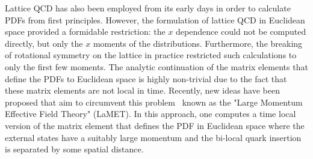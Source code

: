 
Lattice QCD has also been employed from its early days in order  to calculate PDFs from first principles.  However, the
formulation of lattice QCD in Euclidean space provided a formidable
restriction: the $x$ dependence could not be computed directly, but
only the $x$ moments of the distributions.  Furthermore, the breaking
of rotational symmetry on the lattice in practice restricted such
calculations to only the first few moments. 
The analytic continuation of the matrix elements that define the PDFs to Euclidean space is highly non-trivial due to the fact that these matrix elements are not local in time.
Recently, new ideas have
been proposed that aim to circumvent this
problem~\cite{Ji:2013dva,Ji:2014gla} known as the "Large Momentum Effective Field Theory" (LaMET).
In this approach, one computes a time local version of the matrix element that defines the PDF in Euclidean space
where the external states have a suitably large momentum  and the
bi-local quark insertion is separated by some spatial distance.

